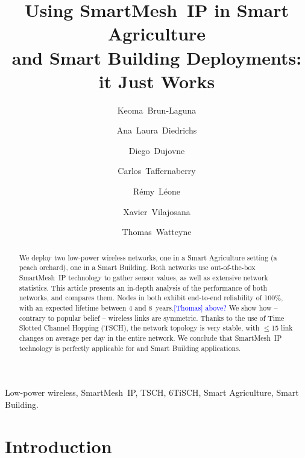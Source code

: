 \documentclass{elsarticle}
\newcommand{\thomas}[1]      {\textcolor{blue}{[Thomas] #1}}
\newcommand{\smip}                {SmartMesh~IP\xspace}
\newcommand{\building}            {Smart Building\xspace}
\newcommand{\agri}                {Smart Agriculture\xspace}
\begin{document}
\begin{frontmatter}

\date{}

\title{Using \smip in \agri \\ and \building Deployments: it Just Works}

\author[inria]{Keoma~Brun-Laguna}
\author[utn]{Ana~Laura~Diedrichs}
\author[udp]{Diego~Dujovne}
\author[utn]{Carlos~Taffernaberry}
\author[inria]{R\'emy~L\'eone}
\author[uoc]{Xavier~Vilajosana}
\author[inria]{Thomas~Watteyne}

\address[inria]{~Inria, EVA team, Paris, France}
\address[utn]{~Univ. Tecnológica Nacional (UTN), Mendoza, Argentina}
\address[udp]{~Univ. Diego Portales, Santiago, Chile}
\address[uoc]{~Univ. Oberta de Catalunya, Barcelona, Catalonia, Spain}

\begin{abstract}
We deploy two low-power wireless networks, one in a \agri setting (a peach orchard), one in a \building.
Both networks use out-of-the-box \smip technology to gather sensor values, as well as extensive network statistics.
This article presents an in-depth analysis of the performance of both networks, and compares them.
Nodes in both exhibit end-to-end reliability of 100\%, with an expected lifetime between 4 and 8~years.\thomas{above?}
We show how -- contrary to popular belief -- wireless links are symmetric.
Thanks to the use of Time Slotted Channel Hopping (TSCH), the network topology is very stable, with $\leq$15 link changes on average per day in the entire network.
We conclude that \smip technology is perfectly applicable for  and \building applications.
\end{abstract}

\begin{keyword}
Low-power wireless, \smip, TSCH, 6TiSCH, \agri, \building.
\end{keyword}

\end{frontmatter}


\section{Introduction}
\label{sec:intro}
\end{document}
